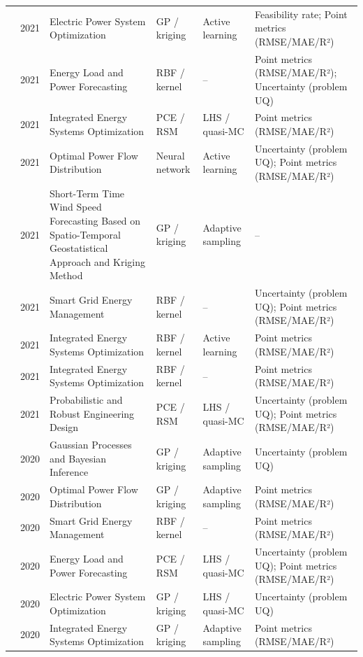 \begin{longtable}{@{}p{} p{} p{} p{} p{} p{}@{}}
  \cite{Nikolaidis2021} & 2021 & Electric Power System Optimization & GP / kriging & Active learning & Feasibility rate; Point metrics (RMSE/MAE/R²) \\
  \cite{Rafi202132436} & 2021 & Energy Load and Power Forecasting & RBF / kernel & -- & Point metrics (RMSE/MAE/R²); Uncertainty (problem UQ) \\
  \cite{Rixhon2021} & 2021 & Integrated Energy Systems Optimization & PCE / RSM & LHS / quasi-MC & Point metrics (RMSE/MAE/R²) \\
  \cite{Srithapon202134395} & 2021 & Optimal Power Flow Distribution & Neural network & Active learning & Uncertainty (problem UQ); Point metrics (RMSE/MAE/R²) \\
  \cite{Wang2021} & 2021 & Short-Term Time Wind Speed Forecasting Based on Spatio-Temporal Geostatistical Approach and Kriging Method & GP / kriging & Adaptive sampling & -- \\
  \cite{Wang20211767} & 2021 & Smart Grid Energy Management & RBF / kernel & -- & Uncertainty (problem UQ); Point metrics (RMSE/MAE/R²) \\
  \cite{Wu2021} & 2021 & Integrated Energy Systems Optimization & RBF / kernel & Active learning & Point metrics (RMSE/MAE/R²) \\
  \cite{Wu2021__2} & 2021 & Integrated Energy Systems Optimization & RBF / kernel & -- & Point metrics (RMSE/MAE/R²) \\
  \cite{Xu20212696} & 2021 & Probabilistic and Robust Engineering Design & PCE / RSM & LHS / quasi-MC & Uncertainty (problem UQ); Point metrics (RMSE/MAE/R²) \\
  \cite{Bianchi2020244} & 2020 & Gaussian Processes and Bayesian Inference & GP / kriging & Adaptive sampling & Uncertainty (problem UQ) \\
  \cite{Deng2020831} & 2020 & Optimal Power Flow Distribution & GP / kriging & Adaptive sampling & Point metrics (RMSE/MAE/R²) \\
  \cite{Faraji2020157284} & 2020 & Smart Grid Energy Management & RBF / kernel & -- & Point metrics (RMSE/MAE/R²) \\
  \cite{Fu20202904} & 2020 & Energy Load and Power Forecasting & PCE / RSM & LHS / quasi-MC & Uncertainty (problem UQ); Point metrics (RMSE/MAE/R²) \\
  \cite{Hu2020} & 2020 & Electric Power System Optimization & GP / kriging & LHS / quasi-MC & Uncertainty (problem UQ) \\
  \cite{Reich2020} & 2020 & Integrated Energy Systems Optimization & GP / kriging & Adaptive sampling & Point metrics (RMSE/MAE/R²) \\

\end{longtable}
